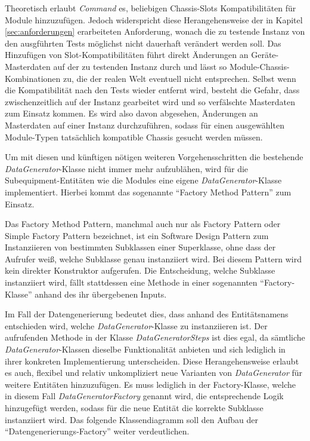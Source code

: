 Theoretisch erlaubt \textit{Command} es, beliebigen Chassis-Slots Kompatibilitäten für Module hinzuzufügen. Jedoch widerspricht diese Herangehensweise der in Kapitel \ref{sec:anforderungen} erarbeiteten Anforderung, wonach die zu testende Instanz von den ausgführten Tests möglichst nicht dauerhaft verändert werden soll. Das Hinzufügen von Slot-Kompatibilitäten führt direkt Änderungen an Geräte-Masterdaten auf der zu testenden Instanz durch und lässt so Module-Chassis-Kombinationen zu, die der realen Welt eventuell nicht entsprechen. Selbst wenn die Kompatibilität nach den Tests wieder entfernt wird, besteht die Gefahr, dass zwischenzeitlich auf der Instanz gearbeitet wird und so verfälschte Masterdaten zum Einsatz kommen. Es wird also davon abgesehen, Änderungen an Masterdaten auf einer Instanz durchzuführen, sodass für einen ausgewählten Module-Typen tatsächlich kompatible Chassis gesucht werden müssen.

Um mit diesen und künftigen nötigen weiteren Vorgehensschritten die bestehende \textit{DataGenerator}-Klasse nicht immer mehr aufzublähen, wird für die Subequipment-Entitäten wie die Modules eine eigene \textit{DataGenerator}-Klasse implementiert. Hierbei kommt das sogenannte \enquote{Factory Method Pattern} zum Einsatz.

Das Factory Method Pattern, manchmal auch nur als Factory Pattern oder Simple Factory Pattern bezeichnet, ist ein Software Design Pattern zum Instanziieren von bestimmten Subklassen einer Superklasse, ohne dass der Aufrufer weiß, welche Subklasse genau instanziiert wird. \cite[S. 168]{metsker:2006} \cite[S. 22]{stelting:2002} Bei diesem Pattern wird kein direkter Konstruktor aufgerufen. Die Entscheidung, welche Subklasse instanziiert wird, fällt stattdessen eine Methode in einer sogenannten \enquote{Factory-Klasse} anhand des ihr übergebenen Inputs. \cite[S. 19f.]{cooper:2000}

Im Fall der Datengenerierung bedeutet dies, dass anhand des Entitätsnamens entschieden wird, welche \textit{DataGenerator}-Klasse zu instanziieren ist. Der aufrufenden Methode in der Klasse \textit{DataGeneratorSteps} ist dies egal, da sämtliche \textit{DataGenerator}-Klassen dieselbe Funktionalität anbieten und sich lediglich in ihrer konkreten Implementierung unterscheiden. Diese Herangehensweise erlaubt es auch, flexibel und relativ unkompliziert neue Varianten von \textit{DataGenerator} für weitere Entitäten hinzuzufügen. Es muss lediglich in der Factory-Klasse, welche in diesem Fall \textit{DataGeneratorFactory} genannt wird, die entsprechende Logik hinzugefügt werden, sodass für die neue Entität die korrekte Subklasse instanziiert wird. Das folgende Klassendiagramm soll den Aufbau der \enquote{Datengenerierungs-Factory} weiter verdeutlichen.

